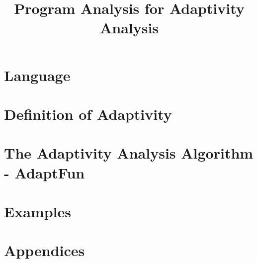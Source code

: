 \documentclass[a4paper,11pt]{article}
\newcommand{\THESYSTEM}{\textsf{AdaptFun}}
\begin{document}
\title{Program Analysis for Adaptivity Analysis}

\author{}

\date{}

\maketitle
%
\tableofcontents


% 
% 

\section{ Language}
\label{sec:language}

\clearpage
\section{Definition of Adaptivity}
\label{sec:adaptivity}

\clearpage
\section{The Adaptivity Analysis Algorithm - {\THESYSTEM}}
\label{sec:algorithm}


\section{Examples}
\label{sec:examples}


% 


% 
% 

%
\clearpage
\appendix
{}
\section*{Appendices}



\end{document}
